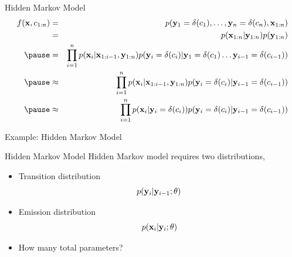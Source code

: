 \documentclass{beamer}
\begin{document}
\begin{frame}{Hidden Markov Model}
  \begin{eqnarray*}
    f(\boldx, c_{1:n}) &=&  p(\boldy_1=\delta(c_1), \ldots, \boldy_n=\delta(c_n), \boldx_{1:n}) \\
                       &=& p(\boldx_{1:n} | \boldy_{1:n}) p(\boldy_{1:n}) \\ \pause
                       &=& \prod_{i=1}^n p(\boldx_i | \boldx_{1:i-1}, \boldy_{1:n}) p(\boldy_i=\delta(c_i) | \boldy_1=\delta(c_1) \ldots \boldy_{i-1}=\delta(c_{i-1})) \\ \pause
                       &\approx& \prod_{i=1}^n p(\boldx_i | \boldx_{1:i-1}, \boldy_{1:n}) p(\boldy_i=\delta(c_i) | \boldy_{i-1}=\delta(c_{i-1})) \\ \pause
                       &\approx& \prod_{i=1}^n p(\boldx_i | \boldy_i = \delta(c_i)) p(\boldy_i=\delta(c_i) | \boldy_{i-1}=\delta(c_{i-1}))
  \end{eqnarray*}
\end{frame}

\begin{frame}{Example: Hidden Markov Model}
\begin{center}  
\end{center}  
\end{frame}


\begin{frame}{Hidden Markov Model}
  Hidden Markov model requires two distributions,
  \begin{itemize}
  \item Transition distribution 
    \[p(\mathbf{y}_i | \mathbf{y}_{i-1}; \theta)\]
  \item Emission distribution
    \[ p(\mathbf{x}_i | \mathbf{y}_i ; \theta)\] 
  \end{itemize}


  \begin{itemize}
  \item How many total parameters?
  \end{itemize}
\end{frame}
\end{document}
